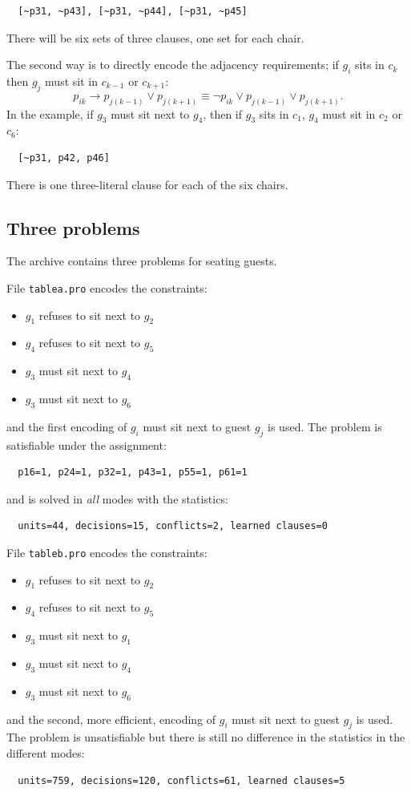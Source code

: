 \documentclass[11pt]{report}
\newcommand*{\p}[1]{\textup{\texttt{#1}}}
\newcommand*{\ngg}{\mathop{\neg}}
\begin{document}
\begin{verbatim}
  [~p31, ~p43], [~p31, ~p44], [~p31, ~p45] 
\end{verbatim}
There will be six sets of three clauses, one set for each chair.

The second way is to directly encode the adjacency requirements; if
$g_i$ sits in $c_{k}$ then $g_j$ must sit in $c_{k-1}$ or $c_{k+1}$:
\begin{displaymath}
p_{ik} \rightarrow p_{j(k-1)} \vee p_{j(k+1)} \equiv
\ngg p_{ik} \vee p_{j(k-1)} \vee p_{j(k+1)}.
\end{displaymath}
In the example, if $g_3$ must sit next to $g_4$, then if $g_3$ sits in
$c_1$, $g_4$ must sit in $c_2$ or $c_6$:
\begin{verbatim}
  [~p31, p42, p46]
\end{verbatim}
There is one three-literal clause for each of the six chairs.


\subsection{Three problems}

The archive contains three problems for seating guests.

File \p{tablea.pro} encodes the constraints:
\begin{itemize}
\item $g_1$ refuses to sit next to $g_2$
\item $g_4$ refuses to sit next to $g_5$
\item $g_3$ must  sit next to $g_4$ 
\item $g_3$ must  sit next to $g_6$ 
\end{itemize}
and the first encoding of $g_i$ must sit next to guest $g_j$ is used.
The problem is satisfiable under the assignment:
\begin{verbatim}
  p16=1, p24=1, p32=1, p43=1, p55=1, p61=1
\end{verbatim}
and is solved in \emph{all} modes with the statistics:
\begin{verbatim}
  units=44, decisions=15, conflicts=2, learned clauses=0
\end{verbatim}

File \p{tableb.pro} encodes the constraints:
\begin{itemize}
\item $g_1$ refuses to sit next to $g_2$
\item $g_4$ refuses to sit next to $g_5$
\item $g_3$ must  sit next to $g_1$
\item $g_3$ must  sit next to $g_4$ 
\item $g_3$ must  sit next to $g_6$ 
\end{itemize}
and the second, more efficient, encoding of $g_i$ must sit next to guest
$g_j$ is used. The problem is unsatisfiable but there is still no
difference in the statistics in the different modes:
\begin{verbatim}
  units=759, decisions=120, conflicts=61, learned clauses=5
\end{verbatim}
\end{document}
